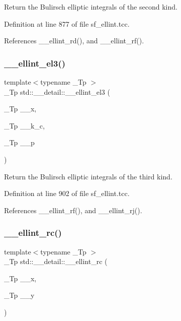 Return the Bulirsch elliptic integrals of the second kind. 

Definition at line 877 of file sf\+\_\+ellint.\+tcc.



References \+\_\+\+\_\+ellint\+\_\+rd(), and \+\_\+\+\_\+ellint\+\_\+rf().

\mbox{\label{namespacestd_1_1____detail_a2a2b5b80edd39b3d1f852f10c5f277fc}} 
\subsubsection{\texorpdfstring{\+\_\+\+\_\+ellint\+\_\+el3()}{\_\_ellint\_el3()}}
{\footnotesize\ttfamily template$<$typename \+\_\+\+Tp $>$ \\
\+\_\+\+Tp std\+::\+\_\+\+\_\+detail\+::\+\_\+\+\_\+ellint\+\_\+el3 (\begin{DoxyParamCaption}\item[{\+\_\+\+Tp}]{\+\_\+\+\_\+x,  }\item[{\+\_\+\+Tp}]{\+\_\+\+\_\+k\+\_\+c,  }\item[{\+\_\+\+Tp}]{\+\_\+\+\_\+p }\end{DoxyParamCaption})}

Return the Bulirsch elliptic integrals of the third kind. 

Definition at line 902 of file sf\+\_\+ellint.\+tcc.



References \+\_\+\+\_\+ellint\+\_\+rf(), and \+\_\+\+\_\+ellint\+\_\+rj().

\mbox{\label{namespacestd_1_1____detail_aa7d81e41240a6d031414c6b117889e36}} 
\subsubsection{\texorpdfstring{\+\_\+\+\_\+ellint\+\_\+rc()}{\_\_ellint\_rc()}}
{\footnotesize\ttfamily template$<$typename \+\_\+\+Tp $>$ \\
\+\_\+\+Tp std\+::\+\_\+\+\_\+detail\+::\+\_\+\+\_\+ellint\+\_\+rc (\begin{DoxyParamCaption}\item[{\+\_\+\+Tp}]{\+\_\+\+\_\+x,  }\item[{\+\_\+\+Tp}]{\+\_\+\+\_\+y }\end{DoxyParamCaption})}



